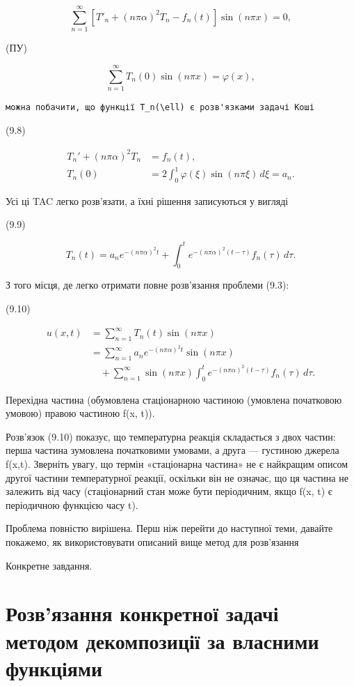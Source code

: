 \documentclass[
  ukrainian,
]{article}
\begin{document}
\[
\sum_{n=1}^{\infty} [T'_n + (n\pi\alpha)^2 T_n - f_n(t)] \sin(n\pi x) = 0,
\]

(ПУ)

\[
\sum_{n=1}^{\infty} T_n(0) \sin(n\pi x) = \varphi(x),
\]

\begin{verbatim}
можна побачити, що функції T_n(\ell) є розв'язками задачі Коші
\end{verbatim}

(9.8)

\[
\begin{aligned}
T_n' + (n\pi\alpha)^2 T_n &= f_n(t), \\
T_n(0) &= 2 \int_0^1 \varphi(\xi)\sin(n\pi \xi)\,d\xi = a_n.
\end{aligned}
\]

Усі ці TAC легко розв'язати, а їхні рішення записуються у вигляді

(9.9)

\[
T_n(t) = a_n e^{-(n\pi\alpha)^2 t} + \int_0^t e^{-(n\pi\alpha)^2 (t-\tau)} f_n(\tau)\,d\tau.
\]

З того місця, де легко отримати повне розв'язання проблеми (9.3):

(9.10)

\[
\begin{aligned}
u(x, t) &= \sum_{n=1}^{\infty} T_n(t)\sin(n\pi x) \\
&= \sum_{n=1}^{\infty} a_n e^{-(n\pi\alpha)^2 t}\sin(n\pi x) \\
&\quad + \sum_{n=1}^{\infty} \sin(n\pi x)\int_0^t e^{-(n\pi\alpha)^2 (t-\tau)} f_n(\tau)\,d\tau.
\end{aligned}
\]

Перехідна частина (обумовлена стаціонарною частиною (умовлена початковою
умовою) правою частиною f(x, t)).

Розв'язок (9.10) показує, що температурна реакція складається з двох
частин: перша частина зумовлена початковими умовами, а друга ---
густиною джерела f(x,t). Зверніть увагу, що термін «стаціонарна частина»
не є найкращим описом другої частини температурної реакції, оскільки він
не означає, що ця частина не залежить від часу (стаціонарний стан може
бути періодичним, якщо f(x, t) є періодичною функцією часу t).

Проблема повністю вирішена. Перш ніж перейти до наступної теми, давайте
покажемо, як використовувати описаний вище метод для розв'язання

Конкретне завдання.

\section{Розв'язання конкретної задачі методом декомпозиції за власними
функціями}\label{ux440ux43eux437ux432ux44fux437ux430ux43dux43dux44f-ux43aux43eux43dux43aux440ux435ux442ux43dux43eux457-ux437ux430ux434ux430ux447ux456-ux43cux435ux442ux43eux434ux43eux43c-ux434ux435ux43aux43eux43cux43fux43eux437ux438ux446ux456ux457-ux437ux430-ux432ux43bux430ux441ux43dux438ux43cux438-ux444ux443ux43dux43aux446ux456ux44fux43cux438}
\end{document}
